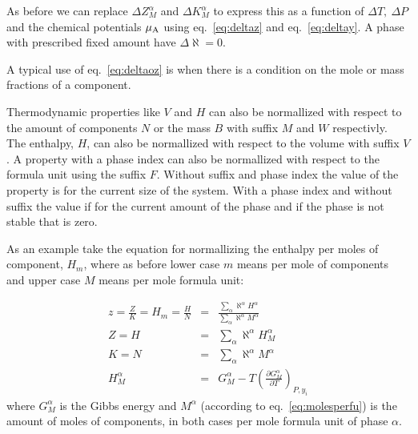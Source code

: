 \documentclass[12pt]{article}
\begin{document}
As before we can replace $\Delta Z^{\alpha}_M$ and $\Delta
K_M^{\alpha}$ to express this as a function of $\Delta T, ~\Delta P$
and the chemical potentials $\mu_{\rm A}$ using eq.~\ref{eq:deltaz} and
eq.~\ref{eq:deltay}.  A phase with prescribed fixed amount have
$\Delta \aleph=0$.

A typical use of eq.~\ref{eq:deltaoz} is when there is a condition on
the mole or mass fractions of a component.

Thermodynamic properties like $V$ and $H$ can also be normallized with
respect to the amount of components $N$ or the mass $B$ with suffix
$M$ and $W$ respectivly.  The enthalpy, $H$, can also be normallized
with respect to the volume with suffix $V$.  A property with a phase
index can also be normallized with respect to the formula unit using
the suffix $F$.  Without suffix and phase index the value of the
property is for the current size of the system.  With a phase index
and without suffix the value if for the current amount of the phase
and if the phase is not stable that is zero.

As an example take the equation for normallizing the enthalpy per
moles of component, $H_m$, where as before lower case $m$ means per
mole of components and upper case $M$ means per mole formula unit:

\begin{eqnarray}
z = \frac{Z}{K} = H_m = \frac{H}{N} &=& \frac{\sum_{\alpha}\aleph^{\alpha} H^{\alpha}}{\sum_{\alpha}\aleph^{\alpha}M^{\alpha}}\\
Z = H &=& \sum_{\alpha}\aleph^{\alpha} H^{\alpha}_M\\
K = N &=& \sum_{\alpha}\aleph^{\alpha}M^{\alpha}\\
H^{\alpha}_M &=& G^{\alpha}_M - T\left(\frac{\partial G^{\alpha}_M}{\partial T}\right)_{P,y_i}
\end{eqnarray}
where $G^{\alpha}_M$ is the Gibbs energy and $M^{\alpha}$ (according
to eq.~\ref{eq:molesperfu}) is the amount of moles of components, in
both cases per mole formula unit of phase $\alpha$.
\end{document}
